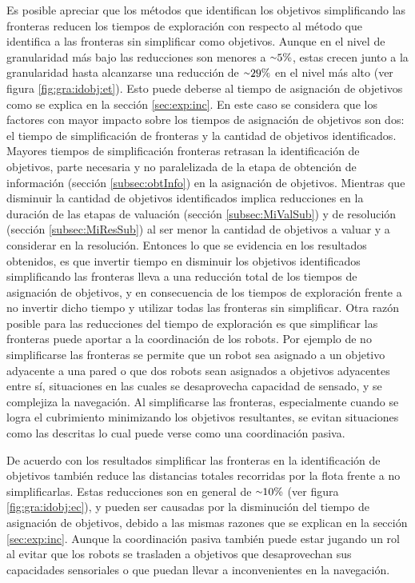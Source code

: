 

Es posible apreciar que los métodos que identifican los objetivos simplificando
las fronteras reducen los tiempos de exploración con respecto al método que
identifica a las fronteras sin simplificar como objetivos. Aunque en el nivel
de granularidad más bajo las reducciones son menores a ${\smallsim}5\%$, estas crecen junto
a la granularidad hasta alcanzarse una reducción de ${\smallsim}29\%$ en el
nivel más alto (ver figura \ref{fig:gra:idobj:et}). Esto puede deberse al tiempo de asignación de objetivos como se
explica en la sección \ref{sec:exp:inc}. En este caso se considera que los
factores con mayor impacto sobre los tiempos de asignación de objetivos son dos:
el tiempo de simplificación de fronteras y la cantidad de objetivos
identificados. Mayores tiempos de simplificación fronteras retrasan la
identificación de objetivos, parte necesaria y no paralelizada de la etapa de
obtención de información (sección \ref{subsec:obtInfo}) en la asignación de
objetivos. Mientras que disminuir la cantidad de objetivos identificados implica
reducciones en la duración de las etapas de valuación (sección
\ref{subsec:MiValSub}) y de resolución (sección \ref{subsec:MiResSub}) al ser
menor la cantidad de objetivos a valuar y a considerar en la resolución. Entonces lo que se evidencia
en los resultados obtenidos, es que invertir tiempo en disminuir los objetivos
identificados simplificando las fronteras lleva a una reducción total de los
tiempos de asignación de objetivos, y en consecuencia de los tiempos de exploración
frente a no invertir dicho tiempo y utilizar todas las fronteras sin
simplificar. Otra razón posible para las reducciones del tiempo de exploración
es que simplificar las fronteras puede aportar a la coordinación de los robots.
Por ejemplo de no simplificarse las fronteras se permite que un robot sea
asignado a un objetivo adyacente a una pared o que dos robots sean asignados a
objetivos adyacentes entre sí, situaciones en las cuales se desaprovecha
capacidad de sensado, y se complejiza la navegación. Al simplificarse las
fronteras, especialmente cuando se logra el cubrimiento minimizando los
objetivos resultantes, se evitan situaciones como las descritas lo cual puede
verse como una coordinación pasiva. %

De acuerdo con los resultados simplificar las fronteras en la identificación de
objetivos también reduce las distancias totales recorridas por la flota frente
a no simplificarlas. Estas reducciones son en general de ${\smallsim}10\%$ (ver figura \ref{fig:gra:idobj:ec}), y
pueden ser causadas por la disminución del tiempo de asignación de objetivos,
debido a las mismas razones que se explican en la sección \ref{sec:exp:inc}.
Aunque la coordinación pasiva también puede estar jugando un rol al evitar que
los robots se trasladen a objetivos que desaprovechan sus capacidades
sensoriales o que puedan llevar a inconvenientes en la navegación.

